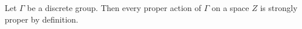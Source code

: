 \begin{rk}
Let $\Gamma$ be a discrete group. Then every proper action of $\Gamma$ on a space $Z$ is strongly proper by definition.
\end{rk}









